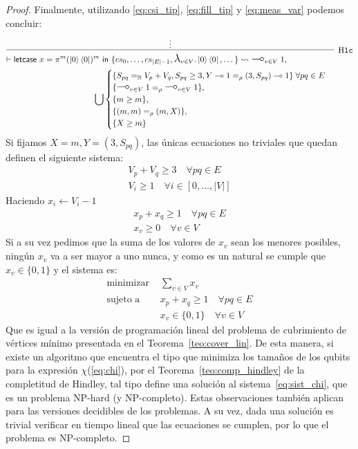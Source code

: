 \begin{proof}
\normalsize
Finalmente, utilizando \ref{eq:csi_tip}, \ref{eq:fill_tip} y \ref{eq:meas_var} podemos concluir: 
\footnotesize
\vspace{\baselineskip}
\begin{equation}
\infer[\text{H}\mathtt{lc}]
{\begin{aligned}
    \vdash \textsf{letcase } x = \pi^m (\ket{0}\bra{0})&^m\textsf{ in }\{cs_0, \dots, cs_{|E|-1}, \biglambda_{v\in V}.\ket{0}\bra{0}, \dots\} \leadsto \bigmultimap_{v\in V} \;1, \\
&\bigcup \begin{cases}
    \{S_{pq} =_\mathbb{N} V_p+V_q, S_{pq} \geq 3, Y\multimap 1 =_\rho (3, S_{pq}) 
    \multimap 1\}\; \forall pq \in E\\
    \{\bigmultimap_{v\in V}\;1 =_\rho \bigmultimap_{v\in V}\;1 \},\\
    \{m\geq m\},\\
    \{(m, m) =_\rho (m, X)\},\\
    \{X\geq m\}
\end{cases}
\end{aligned}}
{\vdots}
\end{equation}
\normalsize
Si fijamos $X=m, Y=(3, S_{pq})$, las únicas ecuaciones no triviales que quedan definen el siguiente sistema:
\begin{gather*}
    V_p + V_q \geq 3 \quad \forall pq \in E \\
    V_i \geq 1 \quad \forall i \in [0,\dots,|V|]
\end{gather*}
Haciendo $x_i \leftarrow V_i-1$
\begin{gather*}
    x_p + x_q \geq 1 \quad \forall pq \in E \\
    x_v \geq 0 \quad \forall v \in V
\end{gather*}
Si a su vez pedimos que la suma de los valores de $x_v$ sean los menores posibles, ningún $x_v$ va a ser mayor a uno nunca, y como es un natural se cumple que $x_v \in \{0, 1\}$ y el sistema es:
\begin{align}
    \text{minimizar } &\sum_{v\in V} x_v \tag*{}\\
    \text{sujeto a } &x_p + x_q \geq 1 \quad \forall pq \in E \tag*{}\\
    &x_v \in \{0, 1\} \quad \forall v \in V\label{eq:sist_chi}
\end{align}
Que es igual a la versión de programación lineal del problema de cubrimiento de vértices mínimo presentada en el Teorema~\ref{teo:cover_lin}.
De esta manera, si existe un algoritmo que encuentra el tipo que minimiza los tamaños de los qubits para la expresión $\chi$(\ref{eq:chi}), por el Teorema~\ref{teo:comp_hindley} de la completitud de Hindley, tal tipo define una solución al sistema~\ref{eq:sist_chi}, que es un problema NP-hard (y NP-completo). Estas observaciones también aplican para las versiones decidibles de los problemas. A su vez, dada una solución es trivial verificar en tiempo lineal que las ecuaciones se cumplen, por lo que el problema es NP-completo.
\end{proof}
